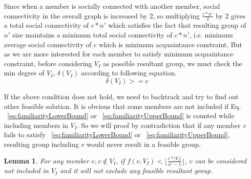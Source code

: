 \documentclass{vldb}
\begin{document}
		Since when a member is socially connected with another member, social connectivity in the overall graph is increased by $ 2 $, so multiplying $ \frac{c*n'}{2} $ by $ 2 $ gives a total social connectivity of $ c*n' $ which satisfies the fact that resulting group of $ n' $ size maintains a minimum total social connectivity of $ c*n' $, i.e. minimum average social connectivity of $ c $ which is  minimum acquaintance constraint. But as we are more interested for each member to satisfy minimum acquaintance constraint, before considering $ V_I $ as possible resultant group, we must check the min degree of $ V_I $, $ \delta(V_I) $ according to following equation.
		\begin{equation}
			\delta(V_I)>=c
		\end{equation}
		
		If the above condition does not hold, we need to backtrack and try to find out other feasible solution. 
		It is obvious that some members are not included if Eq. ~\ref{eq:familiarityLowerBound} or ~\ref{eq:familiarityUpperBound}  is counted while including members in $ V_I $. So we will proof by contradiction that if any member $ v $ fails to satisfy ~\ref{eq:familiarityLowerBound} or ~\ref{eq:familiarityUpperBound}, resulting group including $ v $ would never result in a feasible group. 
		\newtheorem{Lemma}{Lemma}
		\begin{Lemma}
		For any member $ v, v \notin V_I $, if $ f(v,V_I)< \big\lfloor\frac{c*|V_I|}{n'-1}\big\rfloor $, $ v $ can be considered not included in $ V_I $ and it will not exclude any feasible resultant group.
		\end{Lemma}
		
\end{document}
